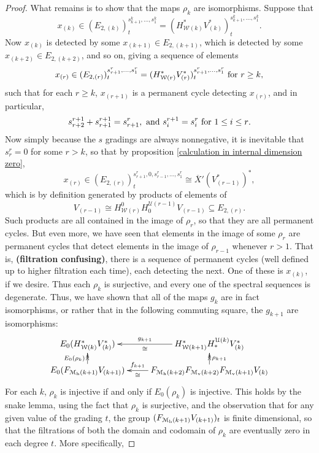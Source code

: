 \documentclass[11pt]{amsart}
\theoremstyle{plain}
\theoremstyle{definition}
\newcommand{\calW}{\mathcal{W}}
\newcommand{\calU}{\mathcal{U}}
\newcommand{\calM}{\mathcal{M}}
\theoremstyle{plain}
\newcommand{\UEAX}{\overline{X}'}%
\begin{document}
\begin{Calculations of HWn for n nonzero}
\begin{proof}
What remains is to show that the maps $\rho_k$ are isomorphisms. Suppose that 
\[x_{(k)}\in (E_{2,(k)})^{s_{k+1}^{k},\ldots,s_1^{k}}_t=(H^*_{\calW(k)}V^*_{(k)})^{s_{k+1}^{k},\ldots,s_1^{k}}_t.\]
Now $x_{(k)}$ is detected by some $x_{(k+1)}\in E_{2,(k+1)}$, which is detected by some $x_{(k+2)}\in E_{2,(k+2)}$, and so on, giving a sequence of elements
\[x_{(r)}\in (E_{2,(r)})^{s_{r+1}^{r},\ldots,s_1^{r}}_t=(H^*_{\calW(r)}V^*_{(r)})^{s_{r+1}^{r},\ldots,s_1^{r}}_t\textup{ for $r\geq k$,}\]
such that for each $r\geq k$, $x_{(r+1)}$ is a permanent cycle detecting $x_{(r)}$, and in particular,
\[s^{r+1}_{r+2}+s^{r+1}_{r+1}=s^{r}_{r+1},\textup{ and }s^{r+1}_{i}=s^{r}_{i}\textup{  for $1\leq i\leq r$}.\]
Now simply because the $s$ gradings are always nonnegative, it is inevitable that $s_r^r=0$ for some $r> k$, so that by proposition \ref{calculation in internal dimension zero},
\[x_{(r)}\in (E_{2,(r)})^{s_{r+1}^{r},0,s_{r-1}^{r},\ldots,s_1^{r}}_{t}\cong\UEAX(V_{(r-1)}^*)^*,\]
which is by definition generated by products of elements of 
\[V_{(r-1)}\cong H^{0}_{\calW(r)}H_0^{\calU(r-1)}V_{(r-1)}\subseteq E_{2,(r)}.\]
Such products are all contained in the image of $\rho_r$, so that they are all permanent cycles. But even more, we have seen that elements in the image of some $\rho_r$ are permanent cycles that detect elements in the image of $\rho_{r-1}$ whenever $r>1$. That is, \textbf{(filtration confusing)}, there is a sequence of permanent cycles (well defined up to higher filtration each time), each detecting the next. One of these is $x_{(k)}$, if we desire. Thus each $\rho_k$ is surjective, and every one of the spectral sequences is degenerate. Thus, we have shown that all of the maps $g_k$ are in fact isomorphisms, or rather that in the following commuting square, the $g_{k+1}$ are isomorphisms:
\[\xymatrix@R=4mm{
E_{0}(H_{\calW(k)}^{*}V^{*}_{(k)})
&H_{\calW(k+1)}^{*}H_*^{\calU(k)}V_{(k)}^*\ar@{->}[l]^-{\cong}_-{{g}_{k+1}}
\\
E_0(F_{\calM_{\textup{h}}(k+1)}V_{(k+1)})\ar@{->>}[u]^-{E_0(\rho_k)}
&F_{\calM_{\textup{h}}(k+2)}F_{\calM_{\textup{v}}(k+2)}F_{\calM_\textup{v}(k+1)}V_{(k)}\ar@{->}[l]^-{\cong}_-{{f}_{k+1}}\ar@{->>}[u]_-{\rho_{k+1}}
}\]
For each $k$, $\rho_k$ is injective if and only if $E_0(\rho_k)$ is injective. This holds by the snake lemma, using the fact that $\rho_k$ is surjective, and the observation that for any given value of the grading $t$, the group $(F_{\calM_{\textup{h}}(k+1)}V_{(k+1)})_t$ is finite dimensional, so that the filtrations of both the domain and codomain of $\rho_k$ are eventually zero in each degree $t$. More specifically,

\end{proof}
\end{Calculations of HWn for n nonzero}
\end{document}

